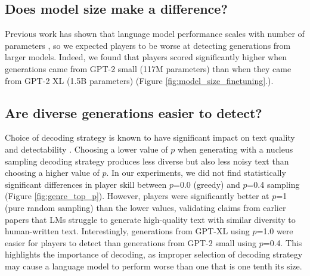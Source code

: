 \subsection{Does model size make a difference?}
Previous work has shown that language model performance scales with number of parameters \citep{kaplan2020scaling}, so we expected players to be worse at detecting generations from larger models.
Indeed, we found that players scored significantly higher when generations came from GPT-2 small (117M parameters) than when they came from GPT-2 XL (1.5B parameters) (Figure \ref{fig:model_size_finetuning}.).



\subsection{Are diverse generations easier to detect?}
Choice of decoding strategy is known to have significant impact on text quality \citep{zhang2021trading} and detectability \citep{ippolito2020automatic}.
Choosing a lower value of $p$ when generating with a nucleus sampling \citep{holtzman2019curious} decoding strategy produces less diverse but also less noisy text than choosing a higher value of $p$.
In our experiments, we did not find statistically significant differences in player skill between $p$=0.0 (greedy) and $p$=0.4 sampling (Figure \ref{fig:genre_top_p}).
However, players were significantly better at $p$=1 (pure random sampling) than the lower values, 
validating claims from earlier papers that LMs struggle to generate high-quality text with similar diversity to human-written text.
Interestingly, generations from GPT-XL using $p$=1.0 were easier for players to detect than generations from GPT-2 small using $p$=0.4.
This highlights the importance of decoding, as improper selection of decoding strategy may cause a language model to perform worse than one that is one tenth its size.


